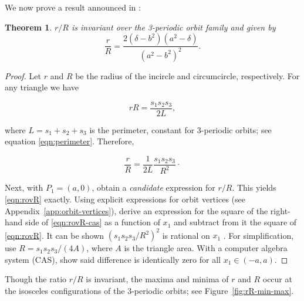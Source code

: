 \documentclass{amsart}
\newtheorem{theorem}{Theorem}
\theoremstyle{definition}
\begin{document}
\noindent We now prove a result announced in  \cite{reznik2019-intelligencer}:

\begin{theorem}
\label{thm:rovR}
$r/R$ is invariant over the 3-periodic orbit family and given by
\begin{equation}
\label{eqn:rovR}
\frac{r}{R}=\frac{2 (\delta-b^2)(a^2-\delta)}{(a^2-b^2)^2}.
\end{equation}
\end{theorem}

\begin{proof}
Let $r$ and $R$ be the radius of the incircle and circumcircle, respectively. For any triangle \cite{coxeter67} we have

\begin{equation*}
 rR=\frac{s_1s_2s_3}{2 L}, 
\end{equation*}

\noindent where $L=s_1+s_2+s_3$ is the perimeter, constant for 3-periodic orbits; see equation \eqref{eqn:perimeter}. Therefore,

\begin{equation}
\frac{r}{R}=\frac{1}{2L} \frac{s_1s_2s_3}{R^2}\cdot
\label{eqn:rovR-cas}
\end{equation}

Next, with $P_1=(a,0)$, obtain a {\em candidate} expression for $r/R$. This yields \eqref{eqn:rovR} exactly. Using explicit expressions for orbit vertices (see Appendix~\ref{app:orbit-vertices}), derive an expression for the square of the right-hand side of \eqref{eqn:rovR-cas} as a function of $x_1$ and subtract from it the square of \eqref{eqn:rovR}. It can be shown $\left(s_1s_2s_3/R^2\right)^2$ is rational on $x_1$ \cite{reznik2020-loci}. For simplification, use $R=s_1 s_2 s_3/(4A)$, where $A$ is the triangle area. With a computer algebra system (CAS), show said difference is identically zero for all $x_1\in(-a,a)$.
\end{proof}

Though the ratio $r/R$ is invariant, the maxima and minima of $r$ and $R$ occur at the isosceles configurations of the 3-periodic orbits; see Figure~\ref{fig:rR-min-max}. 
\end{document}
